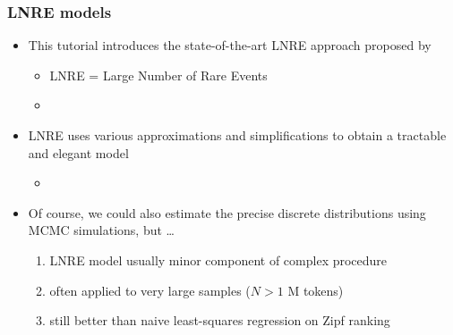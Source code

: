\documentclass[t]{beamer} %
\begin{document}
\begin{frame}
  \frametitle{LNRE models}

  \begin{itemize}
  \item This tutorial introduces the state-of-the-art LNRE approach proposed by \citet{Baayen:01}
    \begin{itemize}
    \item LNRE = Large Number of Rare Events
    \item[]
    \end{itemize}
  \item LNRE uses various approximations and simplifications to obtain a tractable and elegant model
    \begin{itemize}
    \item[]
    \end{itemize}
  \item Of course, we could also estimate the precise discrete distributions using MCMC simulations, but \ldots
    \begin{enumerate}
    \item LNRE model usually minor component of complex procedure
    \item often applied to very large samples ($N > 1$ M tokens)
    \item still better than naive least-squares regression on Zipf ranking
    \end{enumerate}
  \end{itemize}
\end{frame}
\end{document}
